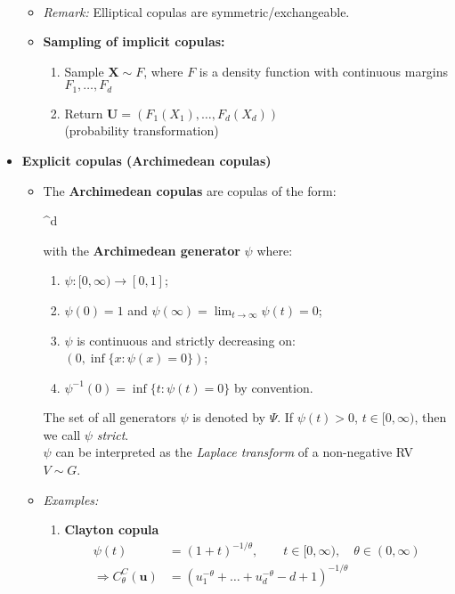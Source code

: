 \documentclass[a4paper,landscape,8pt,fleqn]{scrartcl}
\newcommand*\widefbox[1]{\fbox{\hspace{2em}#1\hspace{2em}}}		%
\renewcommand{\emph}[1]{\textbf{#1}}
\begin{document}
\begin{multicols*}{3}
\begin{itemize}
\begin{itemize}
\begin{enumerate}
\begin{align*}
\end{align*}
\end{enumerate}
\item \textit{Remark:} Elliptical copulas are symmetric/exchangeable.
\item \emph{Sampling of implicit copulas:}
\begin{enumerate}
\item Sample $\bm X \sim F$, where $F$ is a density function with continuous margins $F_1, \ldots, F_d$
\item Return $\bm U = (F_1(X_1), \ldots, F_d(X_d))$ \\
(probability transformation)
\end{enumerate}
\end{itemize}
\item \emph{Explicit copulas (Archimedean copulas)}
\begin{itemize}
\item The \emph{Archimedean copulas} are copulas of the form:
\begin{empheq}[box=\widefbox]{align*}
C(\bm u) &= \psi(\psi^{-1}(u_1) + \ldots + \psi^{-1}(u_d)), \qquad \bm u \in [0,1]^d
\end{empheq}
with the \emph{Archimedean generator} $\psi$ where:
\begin{enumerate}
\item $\psi: [0, \infty) \to [0,1]$;
\item $\psi(0) = 1$ and $\psi(\infty) = \lim_{t \to \infty} \psi(t) = 0$;
\item $\psi$ is continuous and strictly decreasing on: \\
$(0, \inf \lbrace x: \psi(x) = 0 \rbrace)$;
\item $\psi^{-1}(0) = \inf \lbrace t: \psi(t) = 0 \rbrace$ by convention.
\end{enumerate}
The set of all generators $\psi$ is denoted by $\Psi$. If $\psi(t) > 0$, $t \in [0, \infty)$, then we call $\psi$ \textit{strict}. \\
$\psi$ can be interpreted as the \textit{Laplace transform} of a non-negative RV $V \sim G$.
\item \textit{Examples:}
\begin{enumerate}
\item \emph{Clayton copula}
\begin{align*}
\psi(t) &= (1+t)^{-1/\theta}, \qquad t \in [0, \infty), \quad \theta \in (0, \infty) \\
\Rightarrow C_\theta^C(\bm u) &= (u_1^{-\theta} + \ldots + u_d^{-\theta} - d + 1)^{-1/\theta}

\end{align*}
\end{enumerate}
\end{itemize}
\end{itemize}
\end{multicols*}
\end{document}
